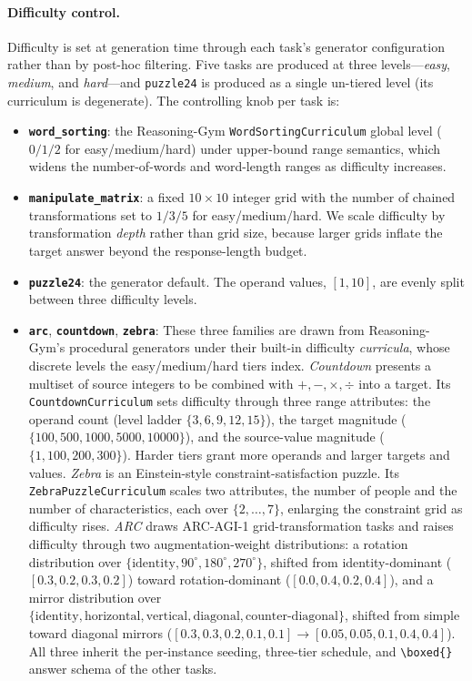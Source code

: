 \paragraph{Difficulty control.}
Difficulty is set at generation time through each task's generator configuration rather than by
post-hoc filtering. Five tasks are produced at three levels---\emph{easy}, \emph{medium}, and
\emph{hard}---and \texttt{puzzle24} is produced as a single un-tiered level (its curriculum is
degenerate). The controlling knob per task is:
\begin{itemize}
  \item \textbf{\texttt{word\_sorting}}: the Reasoning-Gym \texttt{WordSortingCurriculum} global level
        ($0/1/2$ for easy/medium/hard) under upper-bound range semantics, which widens the
        number-of-words and word-length ranges as difficulty increases.
  \item \textbf{\texttt{manipulate\_matrix}}: a fixed $10{\times}10$ integer grid with the number of chained
        transformations set to $1/3/5$ for easy/medium/hard. We scale difficulty by transformation
        \emph{depth} rather than grid size, because larger grids inflate the target answer beyond
        the response-length budget.
  \item \textbf{\texttt{puzzle24}}: the generator default. The operand values, $[1,10]$, are evenly split between three difficulty levels.
  \item \textbf{\texttt{arc}}, \textbf{\texttt{countdown}}, \textbf{\texttt{zebra}}: 
These three families are drawn from Reasoning-Gym's procedural generators under their built-in
difficulty \emph{curricula}, whose discrete levels the easy/medium/hard tiers index. \emph{Countdown} presents a multiset
of source integers to be combined with $+,-,\times,\div$ into a target. Its
\texttt{CountdownCurriculum} sets difficulty through three range attributes: the operand count
(level ladder $\{3,6,9,12,15\}$), the target magnitude ($\{100,500,1000,5000,10000\}$), and the
source-value magnitude ($\{1,100,200,300\}$). Harder tiers grant more operands and larger targets and values. \emph{Zebra} is an Einstein-style constraint-satisfaction puzzle. Its
\texttt{ZebraPuzzleCurriculum} scales two attributes, the number of people and the number of characteristics, each over $\{2,\dots,7\}$, enlarging the constraint grid as difficulty rises.
\emph{ARC} draws ARC-AGI-1 grid-transformation tasks and raises difficulty through two
augmentation-weight distributions: a rotation distribution over
$\{\text{identity},90^\circ,180^\circ,270^\circ\}$, shifted from identity-dominant
($[0.3,0.2,0.3,0.2]$) toward rotation-dominant ($[0.0,0.4,0.2,0.4]$), and a mirror distribution over
$\{\text{identity},\text{horizontal},\text{vertical},\text{diagonal},\text{counter-diagonal}\}$,
shifted from simple toward diagonal mirrors ($[0.3,0.3,0.2,0.1,0.1]\!\rightarrow\![0.05,0.05,0.1,0.4,0.4]$).
All three inherit the per-instance seeding, three-tier schedule, and \verb|\boxed{}| answer schema of
the other tasks.
\end{itemize}


